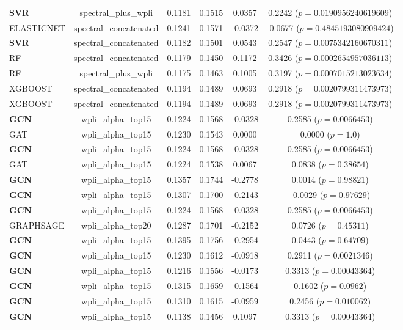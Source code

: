 \begin{table}[t]
\begin{tabular}{lccccc}
  \textbf{SVR} & spectral_plus_wpli & 0.1181 & 0.1515 & 0.0357 & 0.2242 ($p=0.0190956240619609$) \\
  ELASTICNET & spectral_concatenated & 0.1241 & 0.1571 & -0.0372 & -0.0677 ($p=0.4845193080909424$) \\
  \textbf{SVR} & spectral_concatenated & 0.1182 & 0.1501 & 0.0543 & 0.2547 ($p=0.0075342160670311$) \\
  RF & spectral_concatenated & 0.1179 & 0.1450 & 0.1172 & 0.3426 ($p=0.0002654957036113$) \\
  RF & spectral_plus_wpli & 0.1175 & 0.1463 & 0.1005 & 0.3197 ($p=0.0007015213023634$) \\
  XGBOOST & spectral_concatenated & 0.1194 & 0.1489 & 0.0693 & 0.2918 ($p=0.0020799311473973$) \\
  XGBOOST & spectral_concatenated & 0.1194 & 0.1489 & 0.0693 & 0.2918 ($p=0.0020799311473973$) \\
  \textbf{GCN} & wpli_alpha_top15 & 0.1224 & 0.1568 & -0.0328 & 0.2585 ($p=0.0066453$) \\
  GAT & wpli_alpha_top15 & 0.1230 & 0.1543 & 0.0000 & 0.0000 ($p=1.0$) \\
  \textbf{GCN} & wpli_alpha_top15 & 0.1224 & 0.1568 & -0.0328 & 0.2585 ($p=0.0066453$) \\
  GAT & wpli_alpha_top15 & 0.1224 & 0.1538 & 0.0067 & 0.0838 ($p=0.38654$) \\
  \textbf{GCN} & wpli_alpha_top15 & 0.1357 & 0.1744 & -0.2778 & 0.0014 ($p=0.98821$) \\
  \textbf{GCN} & wpli_alpha_top15 & 0.1307 & 0.1700 & -0.2143 & -0.0029 ($p=0.97629$) \\
  \textbf{GCN} & wpli_alpha_top15 & 0.1224 & 0.1568 & -0.0328 & 0.2585 ($p=0.0066453$) \\
  GRAPHSAGE & wpli_alpha_top20 & 0.1287 & 0.1701 & -0.2152 & 0.0726 ($p=0.45311$) \\
  \textbf{GCN} & wpli_alpha_top15 & 0.1395 & 0.1756 & -0.2954 & 0.0443 ($p=0.64709$) \\
  \textbf{GCN} & wpli_alpha_top15 & 0.1230 & 0.1612 & -0.0918 & 0.2911 ($p=0.0021346$) \\
  \textbf{GCN} & wpli_alpha_top15 & 0.1216 & 0.1556 & -0.0173 & 0.3313 ($p=0.00043364$) \\
  \textbf{GCN} & wpli_alpha_top15 & 0.1315 & 0.1659 & -0.1564 & 0.1602 ($p=0.0962$) \\
  \textbf{GCN} & wpli_alpha_top15 & 0.1310 & 0.1615 & -0.0959 & 0.2456 ($p=0.010062$) \\
  \textbf{GCN} & wpli_alpha_top15 & 0.1138 & 0.1456 & 0.1097 & 0.3313 ($p=0.00043364$) \\
\hline
\end{tabular}
\end{table}